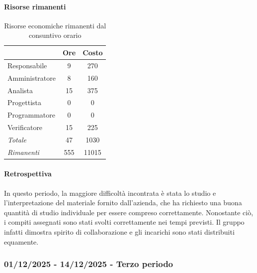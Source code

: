\documentclass[a4paper,12pt]{article}
\begin{document}
            \paragraph{Risorse rimanenti}
                \begin{table}[H]
                \centering
                \begin{tabular}{|l|c|c|}
                \hline
                    \rowcolor{lightgray}{\textbf{Ruolo}} & {\textbf{Ore}} & {\textbf{Costo}}\\
                \hline
                    Responsabile & 9 & 270\\
                \hline
                    Amministratore & 8 & 160\\
                \hline
                    Analista & 15 & 375\\
                \hline
                    Progettista & 0 & 0\\
                \hline
                    Programmatore & 0 & 0\\
                \hline
                    Verificatore & 15 & 225\\
                \hline
                    \rowcolor{lightgray}\textit{Totale} & 47 & 1030\\
                \hline
                    \rowcolor{lightgray}\textit{Rimanenti} & 555 & 11015\\
                \hline
                \end{tabular}
                \caption{Risorse economiche rimanenti dal consuntivo orario}
                \end{table}
                
            \paragraph{Retrospettiva}
            In questo periodo, la maggiore difficoltà incontrata è stata lo studio e l'interpretazione del materiale fornito dall'azienda, che ha richiesto una buona quantità di studio individuale per essere compreso correttamente. Nonostante ciò, i compiti assegnati sono stati svolti correttamente nei tempi previsti. Il gruppo infatti dimostra spirito di collaborazione e gli incarichi sono stati distribuiti equamente.

        \subsubsection{01/12/2025 - 14/12/2025 - Terzo periodo}
\end{document}
